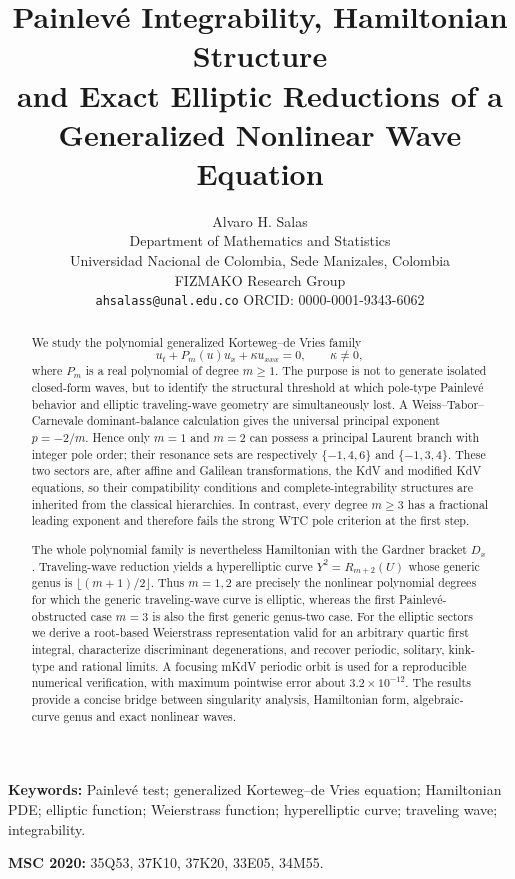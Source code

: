 \documentclass[11pt]{article}
\title{Painlev\'e Integrability, Hamiltonian Structure\\and Exact Elliptic Reductions of a Generalized Nonlinear Wave Equation}
\author{Alvaro H. Salas\\
\small Department of Mathematics and Statistics\\
\small Universidad Nacional de Colombia, Sede Manizales, Colombia\\
\small FIZMAKO Research Group\\
\small \texttt{ahsalass@unal.edu.co} \quad ORCID: 0000-0001-9343-6062}
\date{}
\begin{document}
\maketitle

\begin{abstract}
We study the polynomial generalized Korteweg--de Vries family
\[
 u_t+P_m(u)u_x+\kappa u_{xxx}=0,\qquad \kappa\neq0,
\]
where $P_m$ is a real polynomial of degree $m\ge1$.  The purpose is not to generate isolated closed-form waves, but to identify the structural threshold at which pole-type Painlev\'e behavior and elliptic traveling-wave geometry are simultaneously lost.  A Weiss--Tabor--Carnevale dominant-balance calculation gives the universal principal exponent $p=-2/m$.  Hence only $m=1$ and $m=2$ can possess a principal Laurent branch with integer pole order; their resonance sets are respectively $\{-1,4,6\}$ and $\{-1,3,4\}$.  These two sectors are, after affine and Galilean transformations, the KdV and modified KdV equations, so their compatibility conditions and complete-integrability structures are inherited from the classical hierarchies.  In contrast, every degree $m\ge3$ has a fractional leading exponent and therefore fails the strong WTC pole criterion at the first step.

The whole polynomial family is nevertheless Hamiltonian with the Gardner bracket $D_x$.  Traveling-wave reduction yields a hyperelliptic curve $Y^2=R_{m+2}(U)$ whose generic genus is $\lfloor(m+1)/2\rfloor$.  Thus $m=1,2$ are precisely the nonlinear polynomial degrees for which the generic traveling-wave curve is elliptic, whereas the first Painlev\'e-obstructed case $m=3$ is also the first generic genus-two case.  For the elliptic sectors we derive a root-based Weierstrass representation valid for an arbitrary quartic first integral, characterize discriminant degenerations, and recover periodic, solitary, kink-type and rational limits.  A focusing mKdV periodic orbit is used for a reproducible numerical verification, with maximum pointwise error about $3.2\times10^{-12}$.  The results provide a concise bridge between singularity analysis, Hamiltonian form, algebraic-curve genus and exact nonlinear waves.
\end{abstract}

\noindent\textbf{Keywords:} Painlev\'e test; generalized Korteweg--de Vries equation; Hamiltonian PDE; elliptic function; Weierstrass function; hyperelliptic curve; traveling wave; integrability.

\noindent\textbf{MSC 2020:} 35Q53, 37K10, 37K20, 33E05, 34M55.
\end{document}

